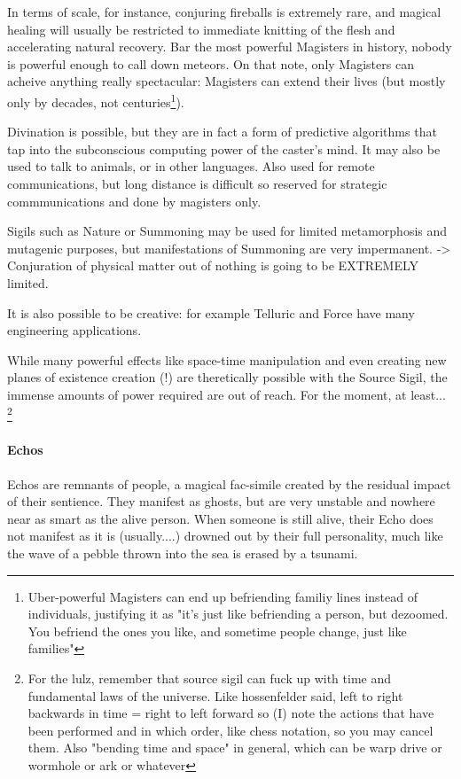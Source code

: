 In terms of scale, for instance, conjuring fireballs is extremely rare, and magical healing will usually be restricted to immediate knitting of the flesh and accelerating natural recovery. Bar the most powerful Magisters in history, nobody is powerful enough to call down meteors. On that note, only Magisters can acheive anything really spectacular: Magisters can extend their lives (but mostly only by decades, not centuries\footnote{Uber-powerful Magisters can end up befriending familiy lines instead of individuals, justifying it as "it's just like befriending a person, but dezoomed. You befriend the ones you like, and sometime people change, just like families"}).

Divination is possible, but they are in fact a form of predictive algorithms that tap into the subconscious computing power of the caster's mind. It may also be used to talk to animals, or in other languages. Also used for remote communications, but long distance is difficult so reserved for strategic commmunications and done by magisters only.

Sigils such as Nature or Summoning may be used for limited  metamorphosis and mutagenic purposes, but manifestations of Summoning are very impermanent. -> Conjuration of physical matter out of nothing is going to be EXTREMELY limited. 

It is also possible to be creative: for example Telluric and Force have many engineering applications.

While many powerful effects like space-time manipulation and even creating new planes of existence creation (!) are theretically possible with the Source Sigil, the immense amounts of power required are out of reach. For the moment, at least...
 \footnote{For the lulz, remember that source sigil can fuck up with time and fundamental laws of the universe. Like hossenfelder said, left to right backwards in time = right to left forward so (I) note the actions that have been performed and in which order, like chess notation, so you may cancel them. Also "bending time and space" in general, which can be warp drive or wormhole or ark or whatever}



\paragraph{Echos}

Echos are remnants of people, a magical fac-simile created by the residual impact of their sentience. They manifest as ghosts, but are very unstable and nowhere near as smart as the alive person. When someone is still alive, their Echo does not manifest as it is (usually....) drowned out by their full personality, much like the wave of a pebble thrown into the sea is erased by a tsunami. 

